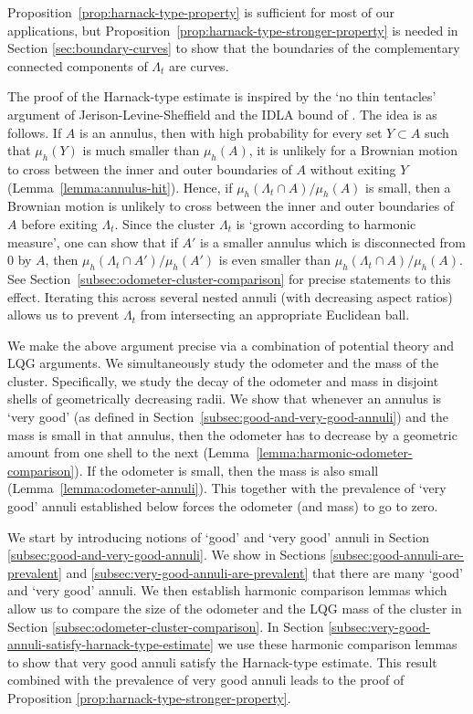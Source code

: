 \documentclass[12pt]{amsart}
\numberwithin{equation}{section}
\newcommand{\cluster}[2]{\hyperref[eq:non-co-set]{\mathit{\Lambda}^{#1}_{#2}}}
\begin{document}
	Proposition~\ref{prop:harnack-type-property} is sufficient for most of our applications, but Proposition~\ref{prop:harnack-type-stronger-property} is needed in Section \ref{sec:boundary-curves} to show that the boundaries
	of the complementary connected components of ${\cluster{}{t}}$ are curves. 
	
	The proof of the Harnack-type estimate is inspired by the `no thin tentacles' argument of Jerison-Levine-Sheffield \cite{jerison2012logarithmic}
	and the IDLA bound of \cite{duminil2013containing}. 
	The idea is as follows. If $A$ is an annulus, then with high probability for every set $Y\subset A$ such that $\mu_h(Y)$ is much smaller than $\mu_h(A)$, it is unlikely for a Brownian motion to cross between the inner and outer boundaries of $A$ without exiting $Y$ (Lemma~\ref{lemma:annulus-hit}). Hence, if $\mu_h({\cluster{}{t}} \cap A) / \mu_h(A)$ is small, then a Brownian motion is unlikely to cross between the inner and outer boundaries of $A$ before exiting ${\cluster{}{t}}$. Since the cluster ${\cluster{}{t}}$ is `grown according to harmonic measure', one can show that if $A'$ is a smaller annulus which is disconnected from 0 by $A$, then $\mu_h({\cluster{}{t}} \cap A') / \mu_h(A')$ is even smaller than $\mu_h({\cluster{}{t}} \cap A) / \mu_h(A)$. See Section~\ref{subsec:odometer-cluster-comparison} for precise statements to this effect. Iterating this across several nested annuli (with decreasing aspect ratios) allows us to prevent ${\cluster{}{t}}$ from intersecting an appropriate Euclidean ball.
	
	
	
	We make the above argument precise via a combination of potential theory and LQG arguments.
	We simultaneously study the odometer and the mass of the cluster. Specifically, we study the decay of the odometer and mass in disjoint shells of geometrically decreasing radii. We show that whenever an annulus is `very good' (as defined in Section~\ref{subsec:good-and-very-good-annuli}) and the mass is small in that annulus, then the odometer has to decrease by a geometric amount from one shell to the next (Lemma~\ref{lemma:harmonic-odometer-comparison}). If the odometer is small, then the mass is also small (Lemma~\ref{lemma:odometer-annuli}). This together with the prevalence of `very good' annuli established below forces the odometer (and mass) to go to zero. 
	
	We start by introducing notions of `good' and `very good' annuli
	in Section \ref{subsec:good-and-very-good-annuli}. We show in Sections \ref{subsec:good-annuli-are-prevalent}
	and \ref{subsec:very-good-annuli-are-prevalent} that there are many `good' and `very good' annuli.
	We then establish harmonic comparison lemmas which allow us to compare the size of the odometer and the LQG mass of the cluster
	in Section \ref{subsec:odometer-cluster-comparison}. In Section \ref{subsec:very-good-annuli-satisfy-harnack-type-estimate}
	we use these harmonic comparison lemmas to show that very good annuli satisfy the Harnack-type estimate. This result
	combined with the prevalence of very good annuli leads to the proof of Proposition \ref{prop:harnack-type-stronger-property}. 
	
\end{document}
